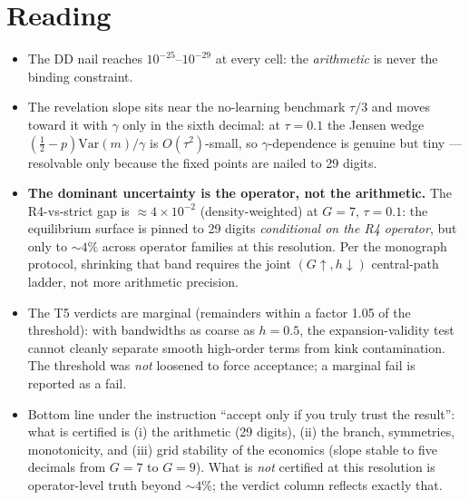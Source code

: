 \documentclass[11pt]{article}
\begin{document}
\section*{Reading}
\begin{itemize}
  \item The DD nail reaches $10^{-25}$--$10^{-29}$ at every cell: the
        \emph{arithmetic} is never the binding constraint.
  \item The revelation slope sits near the no-learning benchmark
        $\tau/3$ and moves toward it with $\gamma$ only in the sixth
        decimal: at $\tau = 0.1$ the Jensen wedge
        $(\tfrac12 - p)\mathrm{Var}(m)/\gamma$ is $O(\tau^2)$-small,
        so $\gamma$-dependence is genuine but tiny --- resolvable only
        because the fixed points are nailed to 29 digits.
  \item \textbf{The dominant uncertainty is the operator, not the
        arithmetic.} The R4-vs-strict gap is $\approx 4\times10^{-2}$
        (density-weighted) at $G = 7$, $\tau = 0.1$: the equilibrium
        surface is pinned to 29 digits \emph{conditional on the R4
        operator}, but only to $\sim 4\%$ across operator families at
        this resolution. Per the monograph protocol, shrinking that
        band requires the joint $(G\uparrow, h\downarrow)$ central-path
        ladder, not more arithmetic precision.
  \item The T5 verdicts are marginal (remainders within a factor 1.05
        of the threshold): with bandwidths as coarse as $h = 0.5$, the
        expansion-validity test cannot cleanly separate smooth
        high-order terms from kink contamination. The threshold was
        \emph{not} loosened to force acceptance; a marginal fail is
        reported as a fail.
  \item Bottom line under the instruction ``accept only if you truly
        trust the result'': what is certified is (i) the arithmetic
        (29 digits), (ii) the branch, symmetries, monotonicity, and
        (iii) grid stability of the economics (slope stable to five
        decimals from $G=7$ to $G=9$). What is \emph{not} certified at
        this resolution is operator-level truth beyond $\sim 4\%$;
        the verdict column reflects exactly that.
\end{itemize}
\end{document}
